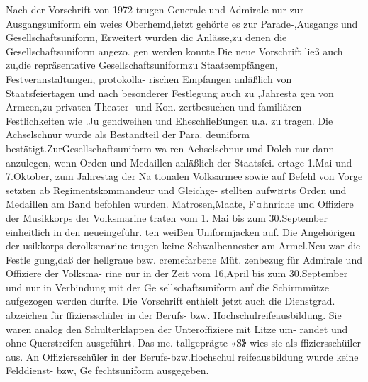 Nach der Vorschrift von 1972 trugen Generale
und Admirale nur zur Ausgangsuniform ein weies
Oberhemd,ietzt gehörte es zur Parade-,Ausgangs
und Gesellschaftsuniform, Erweitert wurden dic
Anlässe,zu denen die Gesellschaftsuniform angezo.
gen werden konnte.Die neue Vorschrift ließ auch
zu,die repräsentative Gesellschaftsuniformzu
Staatsempfängen, Festveranstaltungen, protokolla-
rischen Empfangen anläßlich von Staatsfeiertagen
und nach besonderer Festlegung auch zu ,Jahresta
gen von Armeen,zu privaten Theater- und Kon.
zertbesuchen und familiären Festlichkeiten wie .Ju
gendweihen und EheschlieBungen u.a. zu tragen.
Die Achselschnur wurde als Bestandteil der Para.
deuniform bestätigt.ZurGesellschaftsuniform wa
ren Achselschnur und Dolch nur dann anzulegen,
wenn Orden und Medaillen anläßlich der Staatsfei.
ertage 1.Mai und 7.Oktober, zum Jahrestag der Na
tionalen Volksarmee sowie auf Befehl von Vorge
setzten ab Regimentskommandeur und Gleichge-
stellten aufw¤rts Orden und Medaillen am Band
befohlen wurden.
Matrosen,Maate, F¤hnriche und Offiziere der
Musikkorps der Volksmarine traten vom 1. Mai bis
zum 30.September einheitlich in den neueingeführ.
ten weiBen Uniformjacken auf. Die Angehörigen
der usikkorps derolksmarine trugen keine
Schwalbennester am Armel.Neu war die Festle
gung,daß der hellgraue bzw. cremefarbene Müt.
zenbezug für Admirale und Offiziere der Volksma-
rine nur in der Zeit vom 16,April bis zum
30.September und nur in Verbindung mit der Ge
sellschaftsuniform auf die Schirmmütze aufgezogen
werden durfte.
Die Vorschrift enthielt jetzt auch die Dienstgrad.
abzeichen für ffiziersschüler in der Berufs- bzw.
Hochschulreifeausbildung. Sie waren analog den
Schulterklappen der Unteroffiziere mit Litze um-
randet und ohne Querstreifen ausgeführt. Das me.
tallgeprägte «S》 wies sie als ffiziersschüiler aus.
An Offiziersschüler in der Berufs-bzw.Hochschul
reifeausbildung wurde keine Felddienst- bzw, Ge
fechtsuniform ausgegeben.